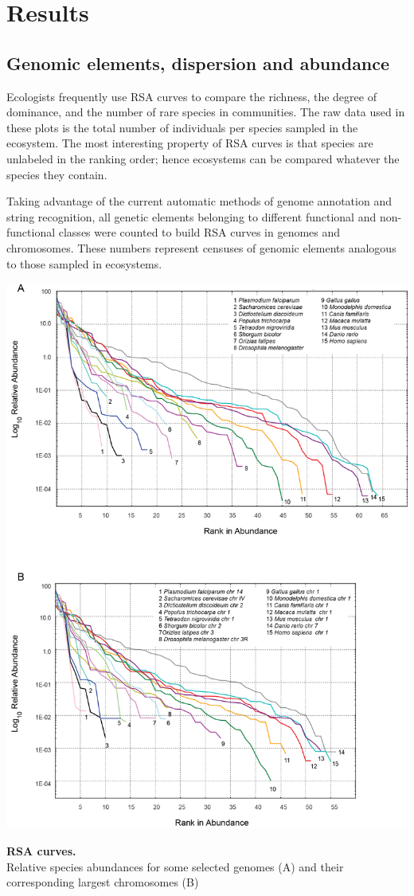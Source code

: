 \section{Results}

\subsection{Genomic elements, dispersion and abundance}

Ecologists frequently use RSA curves to compare the richness, the degree of dominance, and the number of rare species in communities. The raw data used in these plots is the total number of individuals per species sampled in the ecosystem. The most interesting property of RSA curves is that species are unlabeled in the ranking order; hence ecosystems can be compared whatever the species they contain.

Taking advantage of the current automatic methods of genome annotation and string recognition, all genetic elements belonging to different functional and non-functional classes were counted to build RSA curves in genomes and chromosomes. These numbers represent censuses of genomic elements analogous to those sampled in ecosystems.

\begin{FPfigure}
\centering 
\includegraphics[width=\textwidth]{tex_source/figures/untb_genomes/SAD_genomes.png}
\caption[RSA curves.]{{\bf RSA curves.} \\ Relative species abundances for some selected genomes (A) and their corresponding largest chromosomes (B)} 
\label{fig:rsa_genomes}
\end{FPfigure}

